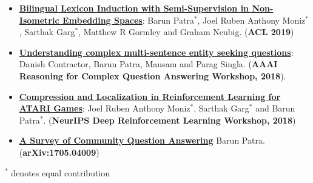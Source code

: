 \documentclass[8pt,a4paper]{article}
\begin{document}
{\begin{itemize}[label={}]
    \item \href{https://www.aclweb.org/anthology/P19-1018.pdf}{\textbf{Bilingual Lexicon Induction with Semi-Supervision in Non-Isometric Embedding Spaces}}: Barun Patra$^{*}$, Joel Ruben Anthony Moniz$^{*}$, Sarthak Garg$^{*}$, Matthew R Gormley and Graham Neubig. (\textbf{ACL 2019})
    \item \href{https://pdfs.semanticscholar.org/90aa/b652eed53d7a5b8284c173b1aac698a43e4c.pdf}{\textbf{Understanding complex multi-sentence entity seeking questions}}: Danish Contractor, Barun Patra, Mausam and Parag Singla. (\textbf{AAAI Reasoning for Complex Question Answering Workshop, 2018}).
    \item \href{https://arxiv.org/pdf/1904.09489.pdf}{\textbf{Compression and Localization in Reinforcement Learning for ATARI Games}}: Joel Ruben Anthony Moniz$^{*}$, Sarthak Garg$^{*}$ and Barun Patra$^{*}$. (\textbf{NeurIPS Deep Reinforcement Learning Workshop, 2018})
    \item \href{https://arxiv.org/abs/1705.04009}{\textbf{A Survey of Community Question Answering}} Barun Patra. (\textbf{arXiv:1705.04009})
  \end{itemize}
  $^{*}$ denotes equal contribution
}

\spacedhrule{0.6em}{-0.4em}  %


\end{document}
